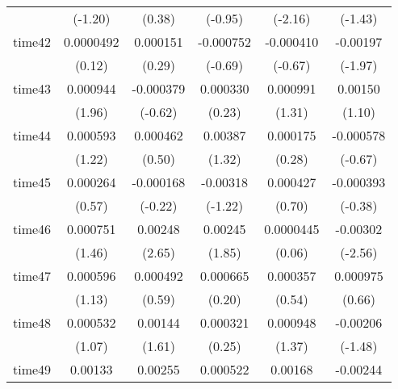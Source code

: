 \begin{table}[htbp]
\begin{tabular}{l*{5}{c}}
            &     (-1.20)         &      (0.38)         &     (-0.95)         &     (-2.16)         &     (-1.43)         \\
time42      &   0.0000492         &    0.000151         &   -0.000752         &   -0.000410         &    -0.00197\sym{*}  \\
            &      (0.12)         &      (0.29)         &     (-0.69)         &     (-0.67)         &     (-1.97)         \\
time43      &    0.000944         &   -0.000379         &    0.000330         &    0.000991         &     0.00150         \\
            &      (1.96)         &     (-0.62)         &      (0.23)         &      (1.31)         &      (1.10)         \\
time44      &    0.000593         &    0.000462         &     0.00387         &    0.000175         &   -0.000578         \\
            &      (1.22)         &      (0.50)         &      (1.32)         &      (0.28)         &     (-0.67)         \\
time45      &    0.000264         &   -0.000168         &    -0.00318         &    0.000427         &   -0.000393         \\
            &      (0.57)         &     (-0.22)         &     (-1.22)         &      (0.70)         &     (-0.38)         \\
time46      &    0.000751         &     0.00248\sym{**} &     0.00245         &   0.0000445         &    -0.00302\sym{*}  \\
            &      (1.46)         &      (2.65)         &      (1.85)         &      (0.06)         &     (-2.56)         \\
time47      &    0.000596         &    0.000492         &    0.000665         &    0.000357         &    0.000975         \\
            &      (1.13)         &      (0.59)         &      (0.20)         &      (0.54)         &      (0.66)         \\
time48      &    0.000532         &     0.00144         &    0.000321         &    0.000948         &    -0.00206         \\
            &      (1.07)         &      (1.61)         &      (0.25)         &      (1.37)         &     (-1.48)         \\
time49      &     0.00133\sym{*}  &     0.00255\sym{*}  &    0.000522         &     0.00168         &    -0.00244         \\

\end{tabular}
\end{table}
